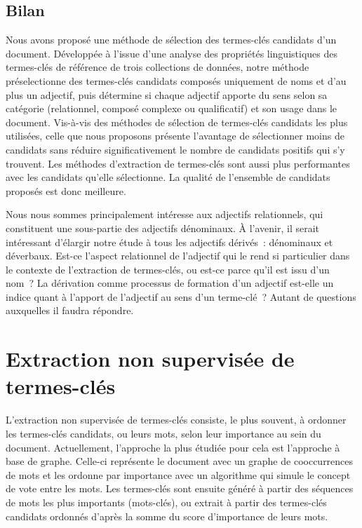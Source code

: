     \subsection{Bilan}
    \label{subsec:main:domain_independent_keyphrase_extraction-keyphrase_candidate_selection-conclusion}
      Nous avons proposé une méthode de sélection des termes-clés candidats d'un
      document. Développée à l'issue d'une analyse des propriétés linguistiques
      des termes-clés de référence de trois collections de données, notre
      méthode préselectionne des termes-clés candidats composés uniquement de
      noms et d'au plus un adjectif, puis détermine si chaque adjectif
      apporte du sens selon sa catégorie (relationnel, composé complexe ou
      qualificatif) et son usage dans le document. Vis-à-vis des méthodes de
      sélection de termes-clés candidats les plus utilisées, celle que nous
      proposons présente l'avantage de sélectionner moins de candidats sans
      réduire significativement le nombre de candidats positifs qui s'y
      trouvent. Les méthodes d'extraction de termes-clés sont aussi plus
      performantes avec les candidats qu'elle sélectionne. La qualité de
      l'ensemble de candidats proposés est donc meilleure.

      Nous nous sommes principalement intéresse aux adjectifs relationnels, qui
      constituent une sous-partie des adjectifs dénominaux. À l'avenir, il
      serait intéressant d'élargir notre étude à tous les adjectifs dérivés~:
      dénominaux et déverbaux. Est-ce l'aspect relationnel de l'adjectif qui le
      rend si particulier dans le contexte de l'extraction de termes-clés, ou
      est-ce parce qu'il est issu d'un nom~? La dérivation comme processus de
      formation d'un adjectif est-elle un indice quant à l'apport de l'adjectif
      au sens d'un terme-clé~? Autant de questions auxquelles il faudra
      répondre.


  \section{Extraction non supervisée de termes-clés}
  \label{sec:main:domain_independent_keyphrase_extraction-unsupervised_automatic_keyphrase_extraction}
    L'extraction non supervisée de termes-clés consiste, le plus souvent, à
    ordonner les termes-clés candidats, ou leurs mots, selon leur importance au
    sein du document. Actuellement, l'approche la plus étudiée pour cela est
    l'approche à base de graphe. Celle-ci représente le document avec un graphe
    de cooccurrences de mots et les ordonne par importance avec un algorithme
    qui simule le concept de vote entre les mots. Les termes-clés sont ensuite
    généré à partir des séquences de mots les plus importants (mots-clés), ou
    extrait à partir des termes-clés candidats ordonnés d'après la somme du
    score d'importance de leurs mots.

